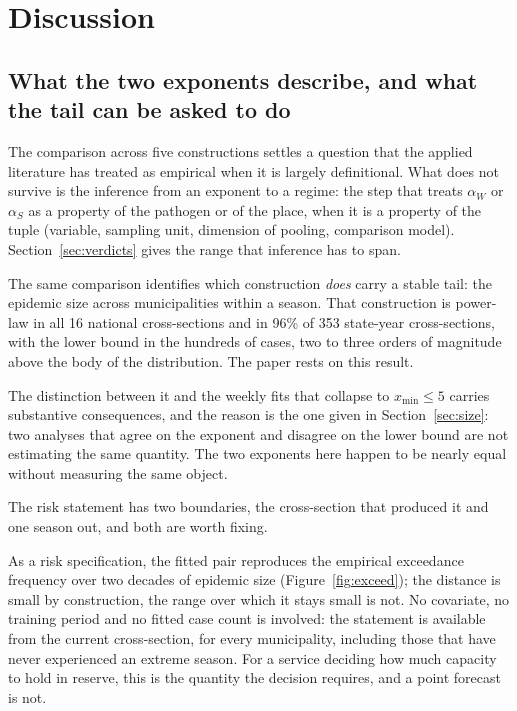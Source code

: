 \documentclass[english,10pt,b5paper]{article}
\begin{document}
\section{Discussion}
\label{sec:discussion}

\subsection{What the two exponents describe, and what the tail can be asked to do}

The comparison across five constructions settles a question that the applied
literature has treated as empirical when it is largely definitional. What does not
survive is the inference from an exponent to a regime: the step that treats
$\alpha_W$ or $\alpha_S$ as a property of the pathogen or of the place, when it is
a property of the tuple (variable, sampling unit, dimension of pooling, comparison
model). Section~\ref{sec:verdicts} gives the range that inference has to span.

The same comparison identifies which construction \emph{does} carry a stable
tail: the epidemic size across municipalities within a season. That
construction is power-law in all 16 national cross-sections and in 96\% of 353
state-year cross-sections, with the lower bound in the hundreds of cases, two
to three orders of magnitude above the body of the distribution. The paper
rests on this result.

The distinction between it and the weekly fits that collapse to
$x_{\min} \le 5$ carries substantive consequences, and the reason is the one given
in Section~\ref{sec:size}: two analyses that agree on the exponent and
disagree on the lower bound are not estimating the same quantity. The two
exponents here happen to be nearly equal without measuring the same object.

The risk statement has two boundaries, the cross-section that produced it and one
season out, and both are worth fixing.

As a risk specification, the fitted pair reproduces the empirical exceedance
frequency over two decades of epidemic size (Figure~\ref{fig:exceed}); the
distance is small by construction, the range over which it stays small is not. No
covariate, no training period and no fitted case count is involved: the statement
is available from the current cross-section, for every municipality, including
those that have never experienced an extreme season. For a service deciding how
much capacity to hold in reserve, this is the quantity the decision requires, and
a point forecast is not.
\end{document}
